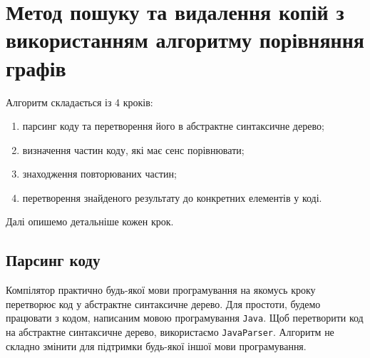 \documentclass[a4paper, 14pt]{article}
\begin{document}
\section{Метод пошуку та видалення копій з використанням алгоритму порівняння графів}
Алгоритм складається із 4 кроків:
\begin{enumerate}
\item парсинг коду та перетворення його в абстрактне синтаксичне дерево;
\item визначення частин коду, які має сенс порівнювати;
\item знаходження повторюваних частин;
\item перетворення знайденого результату до конкретних елементів у коді.
\end{enumerate}
Далі опишемо детальніше кожен крок.
\subsection{Парсинг коду}
Компілятор практично будь-якої мови програмування на якомусь кроку перетворює код у абстрактне синтаксичне дерево. Для простоти, будемо працювати з кодом, написаним мовою програмування \verb|Java|. Щоб перетворити код на абстрактне синтаксичне дерево, використаємо \verb|JavaParser|. Алгоритм не складно змінити для підтримки будь-якої іншої мови програмування.
\end{document}
